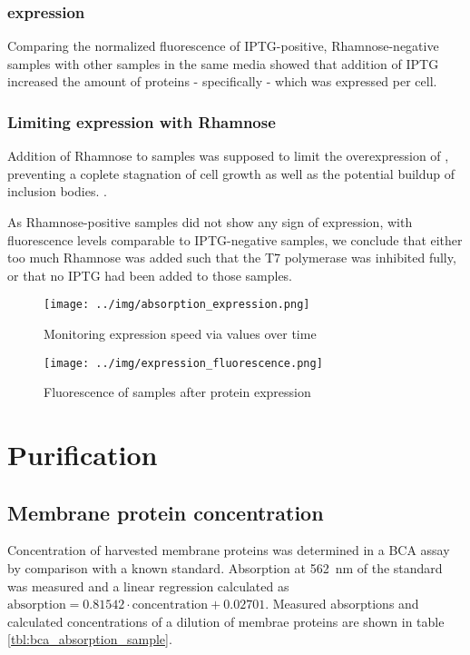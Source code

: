 \subsubsection{\hsdsred{} expression}

Comparing the normalized fluorescence of IPTG-positive, Rhamnose-negative
samples with other samples in the same media showed that addition of IPTG
increased the amount of proteins - specifically \hsdsred{} - which was expressed
per cell.

\subsubsection{Limiting \hsdsred{} expression with Rhamnose}

Addition of Rhamnose to samples was supposed to limit the overexpression of
\hsdsred{}, preventing a coplete stagnation of cell growth as well as the
potential buildup of inclusion bodies. \cite{memstar}.

As Rhamnose-positive samples did not show any sign of \hsdsred{} expression, with
fluorescence levels comparable to IPTG-negative samples, we conclude that
either too much Rhamnose was added such that the T7 polymerase was inhibited
fully, or that no IPTG had been added to those samples.


\begin{figure}
	\centering
	\texttt{[image: ../img/absorption\_expression.png]}
	\caption{Monitoring expression speed via \odbact values over time}
	\label{fig:absorption_expression}
\end{figure}

\begin{figure}
	\centering
	\texttt{[image: ../img/expression\_fluorescence.png]}
	\caption{Fluorescence of samples after protein expression}
	\label{fig:fluorescence_expression}
\end{figure}

\section{Purification}

\subsection{Membrane protein concentration}

Concentration of harvested membrane proteins was determined in a BCA assay by
comparison with a known standard. Absorption at \SI{562}{\nm} of the standard
was measured and a linear regression calculated as $\text{absorption} = 0.81542
\cdot \text{concentration} + 0.02701$. Measured absorptions and calculated
concentrations of a dilution of membrae proteins are shown in table
\ref{tbl:bca_absorption_sample}.

